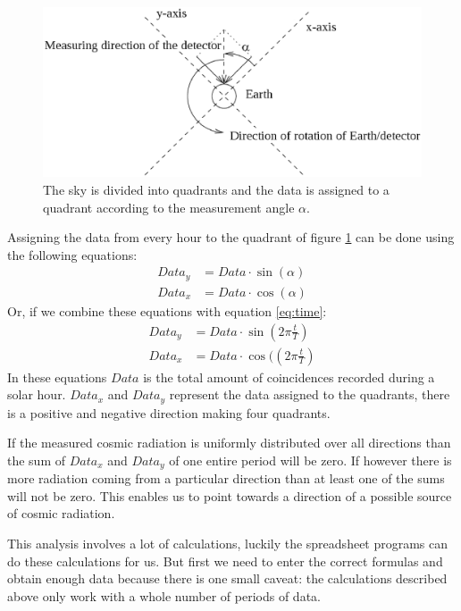 \documentclass[12pt,a4paper]{article}
\numberwithin{equation}{section}
\numberwithin{figure}{section}
\numberwithin{table}{section}
\begin{document}
\begin{figure}\begin{center}
\includegraphics[scale=0.5]{measuring_angle.eps}
\caption{The sky is divided into quadrants and the data is assigned to a quadrant according to the measurement angle $\alpha$.}\label{fig:measuring_angle}
\end{center}\end{figure}

Assigning the data from every hour to the quadrant of figure \ref{fig:measuring_angle} can be done using the following equations:
\begin{align} Data_y &= Data \cdot \sin(\alpha) \\ Data_x &= Data \cdot \cos(\alpha) \end{align}
Or, if we combine these equations with equation \ref{eq:time}:
\begin{align} Data_y &= Data \cdot \sin\left( 2 \pi \frac{t}{T}\right)  \\ Data_x &= Data \cdot \cos(\left( 2 \pi \frac{t}{T}\right) \end{align}
In these equations $Data$ is the total amount of coincidences recorded during a solar hour. $Data_x$ and $Data_y$ represent the data assigned to the quadrants, there is a positive and negative direction making four quadrants.

If the measured cosmic radiation is uniformly distributed over all directions than the sum of $Data_x$ and $Data_y$ of one entire period will be zero. If however there is more radiation coming from a particular direction than at least one of the sums will not be zero. This enables us to point towards a direction of a possible source of cosmic radiation.

This analysis involves a lot of calculations, luckily the spreadsheet programs can do these calculations for us. But first we need to enter the correct formulas and obtain enough data because there is one small caveat: the calculations described above only work with a whole number of periods of data.
\end{document}
